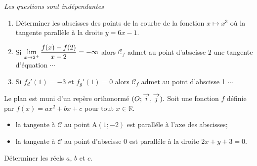 \begin{exercice} 
\textit{Les questions sont indépendantes}
\begin{enumerate}
\item Déterminer les abscisses des points de la courbe de la fonction  $ x\mapsto x^3 $ où la tangente parallèle à la droite $ y=6x-1 $.
\item Si  $\displaystyle \displaystyle \lim_{x\to 2^+}\dfrac{f(x)-f(2)}{x-2}=-\infty $   alors $ \mathcal{C}_{f} $ admet au point d'abscisse 2 une tangente d'équation $ \cdots $
\item Si  $ f_{d}'(1)=-3 $  et  $ f_{g}'(1)=0 $  alors   $ \mathcal{C}_{f} $ admet au point d'abscisse 1 $ \cdots $
\end{enumerate}
\end{exercice}
\begin{exercice}
Le plan est muni d'un repère orthonormé $ (O ;\overrightarrow{i},\overrightarrow{j}). $
Soit une fonction $ f $  d\'efinie par $ f(x)=ax^2+bx+c $ pour tout $x\in \mathbb{R} $.
\begin{itemize}
\item la tangente à $\mathscr{ C}$ au point A$ (1; -2) $ est parall\'ele à l'axe des abscisses;
\item la tangente à $\mathscr{ C}$ au point d'abscisse $ 0 $ est parall\'ele à  la droite $ 2x+y+3=0 $.
\end{itemize}
D\'eterminer les r\'eels $ a$, $ b $ et  $c $.

\end{exercice}



